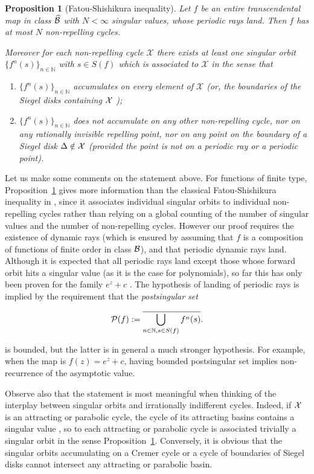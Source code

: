 \documentclass[11pt, twoside]{article}
\newtheorem{prop}[thm]{Proposition}
\theoremstyle{definition}
\newcommand{\N}{\mathbb{N}}
\newcommand{\ov}{\overline}
\newcommand{\BB}{{\cal B}}
\newcommand{\PP}{{\cal P}}
\newcommand{\XX}{{\cal X}}
\newcommand{\BBhat}{\widehat{\BB}}
\begin{document}
\begin{prop}[Fatou-Shishikura inequality]\label{FS1}
Let $f$ be  an entire transcendental map in class $\BBhat$ with $N<\infty$ singular values, whose periodic rays land.  Then $f$ has at most $N$ non-repelling cycles.

Moreover for each non-repelling cycle $\mathcal{X}$ there exists at least one singular orbit  $\{f^n(s)\}_{n\in\N}$ with $s\in S(f)$  which is associated to $\mathcal{X}$ in the sense that 
\begin{enumerate}
\item[\rm (1)]  $\{f^n(s)\}_{n\in\N}$ accumulates on every element of  $\mathcal{X}$ (or, the boundaries of the  Siegel disks containing $\XX$ );
\item[\rm (2)] $\{f^n(s)\}_{n\in\N}$ does not accumulate on any other non-repelling cycle, nor on any rationally invisible repelling point, nor on any point on the boundary of a Siegel disk $\Delta\notin \XX$ (provided the point is not on a periodic ray or a periodic point).
\end{enumerate}
\end{prop}

Let us make some comments on the statement above.  For functions of finite type, Proposition~\ref{FS1} gives more information than the classical Fatou-Shishikura inequality in \cite{EL92}, since it associates individual singular orbits to individual non-repelling cycles rather than relying on a global counting of the number of singular values and the number of non-repelling cycles. However our proof requires the existence of dynamic rays (which is ensured by assuming that $f$ is a composition of functions of finite order in class $\BB$), and that periodic dynamic rays land. Although it is expected that all periodic rays land except  those whose forward orbit hits a singular value (as it is the case for polynomials), so far this has only been proven for the family $e^z+c$ \cite{Re06}. %
 The hypothesis of landing of periodic rays  is implied by the requirement that the {\em postsingular set}
 
\[\PP(f):=\ov{\bigcup_{n\in\N,s\in S(f)}f^n(s)}.\]

 is bounded, but the latter  is in general a much stronger hypothesis. For example, when the map is $f(z)=e^z+c$, having bounded postsingular set implies  non-recurrence of the asymptotic value.
 
Observe also that the statement is most meaningful when thinking of the interplay between singular orbits and  irrationally indifferent cycles. Indeed,  if $\XX$ is an attracting or parabolic cycle, the cycle of its attracting basins  contains a singular value \cite{Mi}, so to each attracting or parabolic cycle is associated trivially a singular orbit in the sense Proposition~\ref{FS1}. Conversely, it is obvious that the singular orbits accumulating on  a Cremer cycle or a cycle of boundaries of Siegel disks  cannot intersect any attracting or parabolic basin. 
\end{document}

